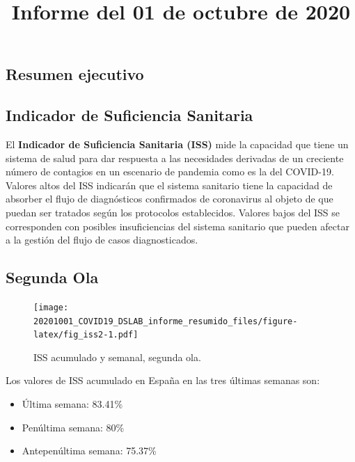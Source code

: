 \documentclass[
  11pt,
]{article}
\title{Informe del 01 de octubre de 2020}
\author{}
\date{\vspace{-2.5em}}
\providecommand{\tightlist}{%
  \setlength{\itemsep}{0pt}\setlength{\parskip}{0pt}}
\begin{document}
\maketitle

\renewcommand{\figurename}{Figura}
\renewcommand{\tablename}{Tabla}

\vspace{-0.5cm}

\hypertarget{resumen-ejecutivo}{%
\subsection{Resumen ejecutivo}\label{resumen-ejecutivo}}

\hypertarget{indicador-de-suficiencia-sanitaria}{%
\subsection{Indicador de Suficiencia
Sanitaria}\label{indicador-de-suficiencia-sanitaria}}

El \textbf{Indicador de Suficiencia Sanitaria (ISS)} mide la capacidad
que tiene un sistema de salud para dar respuesta a las necesidades
derivadas de un creciente número de contagios en un escenario de
pandemia como es la del COVID-19. Valores altos del ISS indicarán que el
sistema sanitario tiene la capacidad de absorber el flujo de
diagnósticos confirmados de coronavirus al objeto de que puedan ser
tratados según los protocolos establecidos. Valores bajos del ISS se
corresponden con posibles insuficiencias del sistema sanitario que
pueden afectar a la gestión del flujo de casos diagnosticados.

\hypertarget{segunda-ola}{%
\subsection{Segunda Ola}\label{segunda-ola}}

\begin{figure}
\centering
\texttt{[image: 20201001\_COVID19\_DSLAB\_informe\_resumido\_files/figure-latex/fig\_iss2-1.pdf]}
\caption{\label{fig:fig_iss2} ISS acumulado y semanal, segunda ola.}
\end{figure}

Los valores de ISS acumulado en España en las tres últimas semanas son:

\begin{itemize}
\tightlist
\item
  Última semana: 83.41\%
\item
  Penúltima semana: 80\%
\item
  Antepenúltima semana: 75.37\%
\end{itemize}
\end{document}
